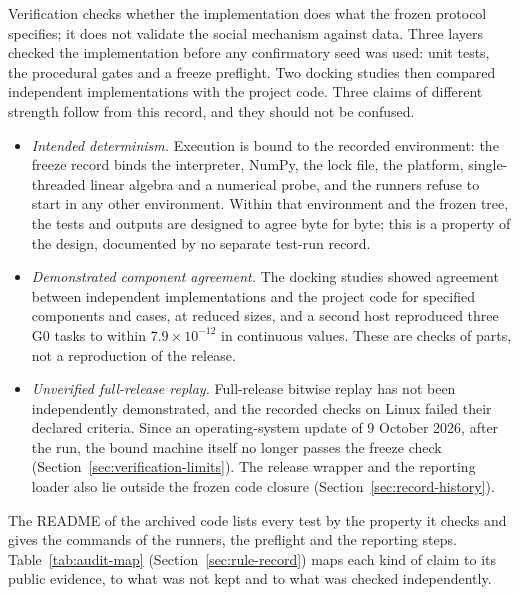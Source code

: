 \label{sec:verification-summary}\label{supp:verification-details}

Verification checks whether the implementation does what the frozen protocol specifies; it does not validate the social mechanism against data. Three layers checked the implementation before any confirmatory seed was used: unit tests, the procedural gates and a freeze preflight. Two docking studies then compared independent implementations with the project code. Three claims of different strength follow from this record, and they should not be confused. %
\begin{itemize}
\item \emph{Intended determinism.} Execution is bound to the recorded environment: the freeze record binds the interpreter, NumPy, the lock file, the platform, single-threaded linear algebra and a numerical probe, and the runners refuse to start in any other environment. Within that environment and the frozen tree, the tests and outputs are designed to agree byte for byte; this is a property of the design, documented by no separate test-run record. %
\item \emph{Demonstrated component agreement.} The docking studies showed agreement between independent implementations and the project code for specified components and cases, at reduced sizes, and a second host reproduced three G0 tasks to within $7.9\times10^{-12}$ in continuous values. These are checks of parts, not a reproduction of the release.
\item \emph{Unverified full-release replay.} Full-release bitwise replay has not been independently demonstrated, and the recorded checks on Linux failed their declared criteria. Since an operating-system update of 9 October 2026, after the run, the bound machine itself no longer passes the freeze check (Section~\ref{sec:verification-limits}). The release wrapper and the reporting loader also lie outside the frozen code closure (Section~\ref{sec:record-history}). %
\end{itemize}
The README of the archived code lists every test by the property it checks and gives the commands of the runners, the preflight and the reporting steps. Table~\ref{tab:audit-map} (Section~\ref{sec:rule-record}) maps each kind of claim to its public evidence, to what was not kept and to what was checked independently.

